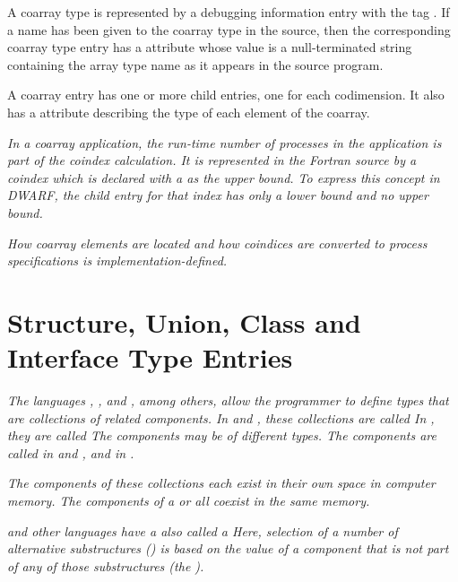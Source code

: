 A coarray type is represented by a debugging information entry 
with the tag \DWTAGcoarraytypeTARG.
If a name has been given to the 
coarray type in the source, then the corresponding coarray type 
entry has a \DWATname{} attribute whose value is a null-terminated 
string containing the array type name as it appears in the source 
program.

A coarray entry has one or more \DWTAGsubrangetype{} child entries,
one for each codimension. It also has a \DWATtype{} attribute 
describing the type of each element of the coarray.

\textit{In a coarray application, the run-time number of processes in the application
is part of the coindex calculation.  It is represented in the Fortran source by
a coindex which is declared with a \doublequote{*} as the upper bound.  To express this
concept in DWARF, the \DWTAGsubrangetype{} child entry for that index has 
only a lower bound and no upper bound.}

\textit{How coarray elements are located and how coindices are 
converted to process specifications is implementation-defined.}

\section{Structure, Union, Class and Interface Type Entries}
\label{chap:structureunionclassandinterfacetypeentries}

\textit{The languages 
, 
, and 
, among others, allow the
programmer to define types that are collections of related
components. 
In  and , these collections are called
In , they are called 
The components may be of different types. The components are
called  in  and 
, and  in .}

\textit{The components of these collections each exist in their
own space in computer memory. The components of a  or 
 all coexist in the same memory.}

\textit{ and 
other languages have a 
also called a  Here, selection of a
number of alternative substructures () is based
on the value of a component that is not part of any of those
substructures (the ).}


